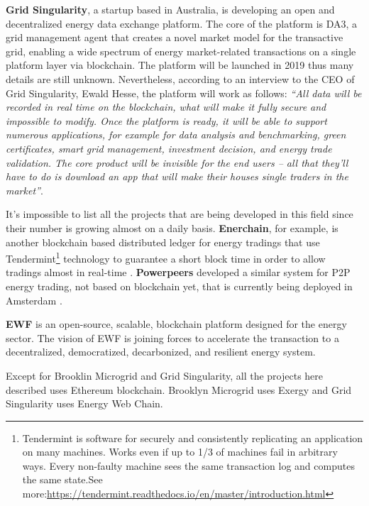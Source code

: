 \textbf{Grid Singularity}, a startup based in Australia, is developing an open and decentralized energy data exchange platform. The core of the platform is DA3,  a grid management agent that creates a novel market model for the transactive grid, enabling a wide spectrum of energy market-related transactions on a single platform layer via blockchain. The platform will be launched in 2019 thus many details are still unknown. Nevertheless, according to an interview to the CEO of Grid Singularity, Ewald Hesse, the platform will work as follows:
\textit{“All data will be recorded in real time on the blockchain, what will make it fully secure and impossible to modify. Once the platform is ready, it will be able to support numerous applications, for example for data analysis and benchmarking, green certificates, smart grid management, investment decision, and energy trade validation. The core product will be invisible for the end users – all that they’ll have to do is download an app that will make their houses single traders in the market”}\cite{gridsingularity}.  	



It’s impossible to list all the projects that are being developed in this field since their number is growing almost on a daily basis. \textbf{Enerchain}, for example, is another blockchain based distributed ledger for energy tradings that use Tendermint\footnote{Tendermint is software for securely and consistently replicating an application on many machines. Works even if up to 1/3 of machines fail in arbitrary ways. Every non-faulty machine sees the same transaction log and computes the same state.See more:\url{https://tendermint.readthedocs.io/en/master/introduction.html}
} technology to guarantee a short block time in order to allow tradings almost in real-time \cite{enerchain}. \textbf{Powerpeers} developed a similar system for P2P energy trading, not based on blockchain yet, that is currently being deployed in Amsterdam \cite{powerpeers}. 



\textbf{\ac{EWF}} is an open-source, scalable, blockchain platform designed for the energy sector. The vision of \ac{EWF} is joining forces to accelerate the transaction to a decentralized, democratized, decarbonized, and resilient energy system. 
	
	
	
Except for Brooklin Microgrid and Grid Singularity, all the projects here described uses Ethereum blockchain. Brooklyn Microgrid uses Exergy and Grid Singularity uses Energy Web Chain.



